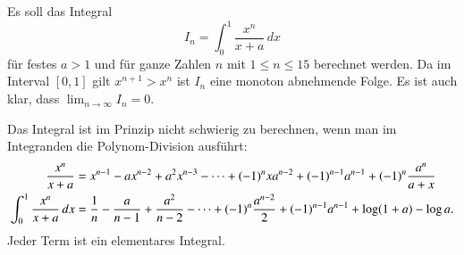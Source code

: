 \begin{beispiel}
Es soll das Integral
\[
I_n = \int_0^1 \frac{x^n}{x+a}\,dx
\]
für festes $a>1$ und für ganze Zahlen $n$ mit $1\le n\le 15$ berechnet
werden.
Da im Interval $[0,1]$ gilt $x^{n+1}>x^n$ ist $I_n$ eine monoton
abnehmende Folge.
Es ist auch klar, dass $\lim_{n\to\infty}I_n=0$.

Das Integral ist im Prinzip nicht schwierig zu berechnen, wenn man im
Integranden die Polynom-Division ausführt:
\begin{align}
\frac{x^n}{x+a}
&=
x^{n-1} -ax^{n-2}+a^2x^{n-3}-\dots +(-1)^n xa^{n-2} +(-1)^{n-1}a^{n-1}
+(-1)^n\frac{a^n}{a+x}
\notag
\\
\int_0^1 \frac{x^n}{x+a}\,dx
&=
\frac1n
-\frac{a}{n-1}
+\frac{a^2}{n-2}
-\dots
+(-1)^n\frac{a^{n-2}}{2}
+(-1)^{n-1}a^{n-1}
+\log(1+a)-\log a.
\label{buch:numerik:instabil:summe}
\end{align}
Jeder Term ist ein elementares Integral.
\end{beispiel}

